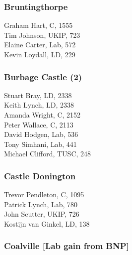 \documentclass[a4paper,openany,10pt]{book}
\begin{document}
\subsubsection*{Bruntingthorpe}



Graham Hart, C, 1555\\
Tim Johnson, UKIP, 723\\
Elaine Carter, Lab, 572\\
Kevin Loydall, LD, 229\\


\subsubsection*{Burbage Castle (2)}



Stuart Bray, LD, 2338\\
Keith Lynch, LD, 2338\\
Amanda Wright, C, 2152\\
Peter Wallace, C, 2113\\
David Hodgen, Lab, 536\\
Tony Simhani, Lab, 441\\
Michael Clifford, TUSC, 248\\


\subsubsection*{Castle Donington}



Trevor Pendleton, C, 1095\\
Patrick Lynch, Lab, 780\\
John Scutter, UKIP, 726\\
Kostijn van Ginkel, LD, 138\\


\subsubsection*{Coalville \hspace*{\fill}\nolinebreak[1]%
\enspace\hspace*{\fill}
[Lab gain from BNP]}

\end{document}
